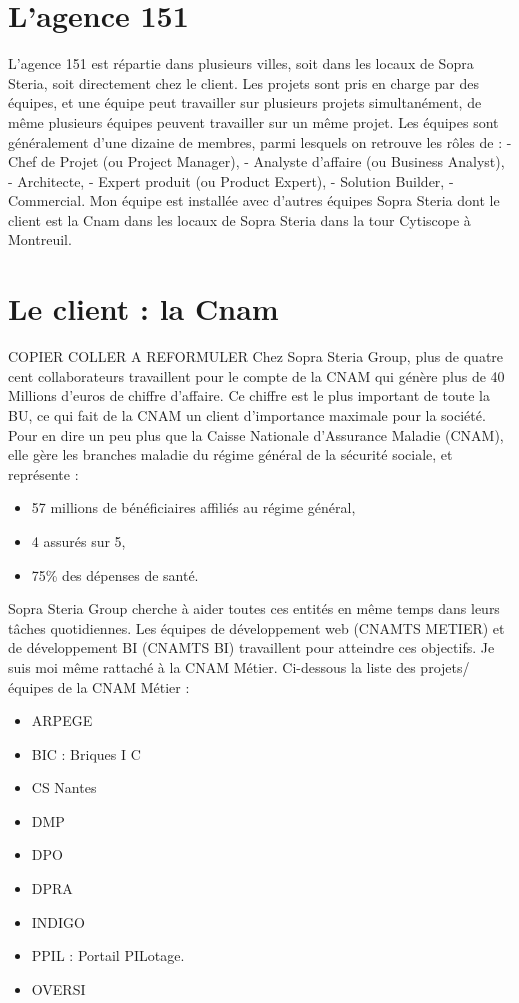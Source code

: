 \section{L'agence 151}
L'agence 151 est répartie dans plusieurs villes, soit dans les locaux de Sopra Steria, soit directement chez le client.
Les projets sont pris en charge par des équipes, et une équipe peut travailler sur plusieurs projets simultanément, de même plusieurs équipes peuvent travailler sur un même projet. Les équipes sont généralement d’une dizaine de membres, parmi lesquels on retrouve les rôles de :
- Chef de Projet (ou Project Manager),
- Analyste d’affaire (ou Business Analyst),
- Architecte,
- Expert produit (ou Product Expert),
- Solution Builder,
- Commercial.
Mon équipe est installée avec d'autres équipes Sopra Steria dont le client est la Cnam dans les locaux de Sopra Steria dans la tour Cytiscope à Montreuil. 

\section{Le client : la Cnam}

COPIER COLLER A REFORMULER
Chez Sopra Steria Group, plus de quatre cent collaborateurs travaillent pour le compte de la CNAM qui génère plus de 40 Millions d’euros de chiffre d’affaire. Ce chiffre est le plus important de toute la BU, ce qui fait de la CNAM un client d’importance maximale pour la société. Pour en dire un peu plus que la Caisse Nationale d’Assurance Maladie (CNAM), elle gère les branches maladie du régime général de la sécurité sociale, et représente :

\begin{itemize}
    \item 57 millions de bénéficiaires affiliés au régime général, 
    \item 4 assurés sur 5, 
    \item 75\% des dépenses de santé. 
\end{itemize}

Sopra Steria Group cherche à aider toutes ces entités en même temps dans leurs tâches quotidiennes. Les équipes de développement web (CNAMTS METIER) et de développement BI (CNAMTS BI) travaillent pour atteindre ces objectifs. Je suis moi même rattaché à la CNAM Métier. Ci-dessous la liste des projets/équipes de la CNAM Métier :

\begin{itemize}
    \item ARPEGE
    \item BIC : Briques I C
    \item CS Nantes
    \item DMP
    \item DPO
    \item DPRA
    \item INDIGO
    \item PPIL : Portail PILotage.
    \item OVERSI
\end{itemize}

